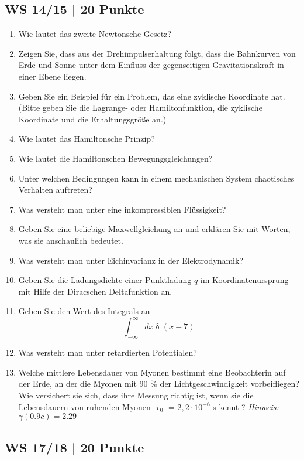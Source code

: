 \subsection{WS 14/15 | 20 Punkte}
\begin{enumerate}
    \item Wie lautet das zweite Newtonsche Gesetz?
    \item Zeigen Sie, dass aus der Drehimpulserhaltung folgt, dass die Bahnkurven von Erde und Sonne unter dem Einfluss der gegenseitigen Gravitationskraft in einer Ebene liegen.
    \item Geben Sie ein Beispiel für ein Problem, das eine zyklische Koordinate hat. (Bitte geben Sie die Lagrange- oder Hamiltonfunktion, die zyklische Koordinate und die Erhaltungsgröße an.)
    \item Wie lautet das Hamiltonsche Prinzip?
    \item Wie lautet die Hamiltonschen Bewegungsgleichungen?
    \item Unter welchen Bedingungen kann in einem mechanischen System chaotisches Verhalten auftreten?
    \item Was versteht man unter eine inkompressiblen Flüssigkeit?
    \item Geben Sie eine beliebige Maxwellgleichung an und erklären Sie mit Worten, was sie anschaulich bedeutet.
    \item Was versteht man unter Eichinvarianz in der Elektrodynamik?
    \item Geben Sie die Ladungsdichte einer Punktladung $q$ im Koordinatenursprung mit Hilfe der Diracschen Deltafunktion an.
    \item Geben Sie den Wert des Integrals an
    \begin{equation*}
        \int_{-\infty}^{\infty} dx \updelta (x-7)
    \end{equation*}
    \item Was versteht man unter retardierten Potentialen?
    \item Welche mittlere Lebensdauer von Myonen bestimmt eine Beobachterin auf der Erde, an der die Myonen mit 90 \% der Lichtgeschwindigkeit vorbeifliegen? Wie versichert sie sich, dass ihre Messung richtig ist, wenn sie die Lebensdauern von ruhenden Myonen $\uptau_0$ = $2,2 \cdot 10^{-6}$ s kennt ? \textit{Hinweis: $\gamma(0.9c) = 2.29$}
\end{enumerate}
\subsection{WS 17/18 | 20 Punkte}



